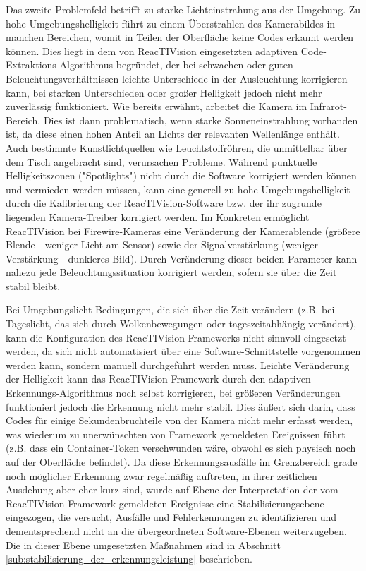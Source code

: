 Das zweite Problemfeld betrifft zu starke Lichteinstrahung aus der Umgebung. Zu hohe Umgebungshelligkeit führt zu einem Überstrahlen des Kamerabildes in manchen Bereichen, womit in Teilen der Oberfläche keine Codes erkannt werden können. Dies liegt in dem von ReacTIVision eingesetzten adaptiven Code-Extraktions-Algorithmus begründet, der bei schwachen oder guten Beleuchtungsverhältnissen leichte Unterschiede in der Ausleuchtung korrigieren kann, bei starken Unterschieden oder großer Helligkeit jedoch nicht mehr zuverlässig funktioniert. Wie bereits erwähnt, arbeitet die Kamera im Infrarot-Bereich. Dies ist dann problematisch, wenn starke Sonneneinstrahlung vorhanden ist, da diese einen hohen Anteil an Lichts der relevanten Wellenlänge enthält. Auch bestimmte Kunstlichtquellen wie Leuchtstoffröhren, die unmittelbar über dem Tisch angebracht sind, verursachen Probleme. Während punktuelle Helligkeitszonen ("Spotlights") nicht durch die Software korrigiert werden können und vermieden werden müssen, kann eine generell zu hohe Umgebungshelligkeit durch die Kalibrierung der ReacTIVision-Software bzw. der ihr zugrunde liegenden Kamera-Treiber korrigiert werden. Im Konkreten ermöglicht ReacTIVision bei Firewire-Kameras eine Veränderung der Kamerablende (größere Blende - weniger Licht am Sensor) sowie der Signalverstärkung (weniger Verstärkung - dunkleres Bild). Durch Veränderung dieser beiden Parameter kann nahezu jede Beleuchtungssituation korrigiert werden, sofern sie über die Zeit stabil bleibt.

Bei Umgebungslicht-Bedingungen, die sich über die Zeit verändern (z.B. bei Tageslicht, das sich durch Wolkenbewegungen oder tageszeitabhängig verändert), kann die Konfiguration des ReacTIVision-Frameworks nicht sinnvoll eingesetzt werden, da sich nicht automatisiert über eine Software-Schnittstelle vorgenommen werden kann, sondern manuell durchgeführt werden muss. Leichte Veränderung der Helligkeit kann das ReacTIVision-Framework durch den adaptiven Erkennungs-Algorithmus noch selbst korrigieren, bei größeren Veränderungen funktioniert jedoch die Erkennung nicht mehr stabil. Dies äußert sich darin, dass Codes für einige Sekundenbruchteile von der Kamera nicht mehr erfasst werden, was wiederum zu unerwünschten von Framework gemeldeten Ereignissen führt (z.B. dass ein Container-Token verschwunden wäre, obwohl es sich physisch noch auf der Oberfläche befindet). Da diese Erkennungsausfälle im Grenzbereich grade noch möglicher Erkennung zwar regelmäßig auftreten, in ihrer zeitlichen Ausdehung aber eher kurz sind, wurde auf Ebene der Interpretation der vom ReacTIVision-Framework gemeldeten Ereignisse eine Stabilisierungsebene eingezogen, die versucht, Ausfälle und Fehlerkennungen zu identifizieren und dementsprechend nicht an die übergeordneten Software-Ebenen weiterzugeben. Die in dieser Ebene umgesetzten Maßnahmen sind in Abschnitt \ref{sub:stabilisierung_der_erkennungsleistung} beschrieben.

